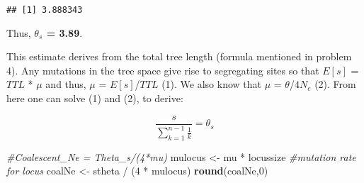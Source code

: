 \documentclass[]{article}
\newenvironment{Shaded}{\begin{snugshade}}{\end{snugshade}}
\newcommand{\KeywordTok}[1]{\textcolor[rgb]{0.13,0.29,0.53}{\textbf{{#1}}}}
\newcommand{\DataTypeTok}[1]{\textcolor[rgb]{0.13,0.29,0.53}{{#1}}}
\newcommand{\DecValTok}[1]{\textcolor[rgb]{0.00,0.00,0.81}{{#1}}}
\newcommand{\FloatTok}[1]{\textcolor[rgb]{0.00,0.00,0.81}{{#1}}}
\newcommand{\StringTok}[1]{\textcolor[rgb]{0.31,0.60,0.02}{{#1}}}
\newcommand{\CommentTok}[1]{\textcolor[rgb]{0.56,0.35,0.01}{\textit{{#1}}}}
\newcommand{\NormalTok}[1]{{#1}}
\begin{document}
\begin{Shaded}
\end{Shaded}

\begin{verbatim}
## [1] 3.888343
\end{verbatim}

Thus, \textbf{$\theta_s$ = 3.89}.

This estimate derives from the total tree length (formula mentioned in
problem 4). Any mutations in the tree space give rise to segregating
sites so that $E[s]$ = $TTL$ * $\mu$ and thus, $\mu$ = $E[s]$/$TTL$ (1).
We also know that $\mu$ = $\theta$/$4N_e$ (2). From here one can solve
(1) and (2), to derive:

\[ \frac{s}{\sum\limits_{k=1}^{n-1} \frac{1}{k}} = \theta_{s} \]

\begin{Shaded}
\begin{Highlighting}[]
\CommentTok{#Coalescent_Ne = Theta_s/(4*mu)}
\NormalTok{mulocus <-}\StringTok{ }\NormalTok{mu *}\StringTok{ }\NormalTok{locussize                   }\CommentTok{#mutation rate for locus}
\NormalTok{coalNe <-}\StringTok{ }\NormalTok{stheta /}\StringTok{ }\NormalTok{(}\DecValTok{4} \NormalTok{*}\StringTok{ }\NormalTok{mulocus)            }
\KeywordTok{round}\NormalTok{(coalNe,}\DecValTok{0}\NormalTok{)}
\end{Highlighting}
\end{Shaded}
\end{document}
